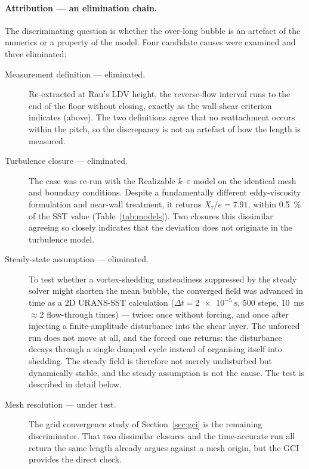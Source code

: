 \documentclass[11pt,a4paper]{article}
\newcommand{\Xr}{X_{\mathrm{r}}}
\begin{document}
\paragraph{Attribution --- an elimination chain.}
The discriminating question is whether the over-long bubble is an artefact
of the numerics or a property of the model. Four candidate causes were
examined and three eliminated:

\begin{description}
  \item[Measurement definition --- eliminated.] Re-extracted at Rau's LDV
  height, the reverse-flow interval runs to the end of the floor without
  closing, exactly as the wall-shear criterion indicates (above). The two
  definitions agree that no reattachment occurs within the pitch, so the
  discrepancy is not an artefact of how the length is measured.

  \item[Turbulence closure --- eliminated.] The case was re-run with the
  Realizable $k$--$\varepsilon$ model on the identical mesh and boundary
  conditions. Despite a fundamentally different eddy-viscosity formulation
  and near-wall treatment, it returns $\Xr/e = 7.91$, within
  \SI{0.5}{\percent} of the SST value (Table~\ref{tab:models}). Two closures
  this dissimilar agreeing so closely indicates that the deviation does not
  originate in the turbulence model.

  \item[Steady-state assumption --- eliminated.] To test whether a
  vortex-shedding unsteadiness suppressed by the steady solver might shorten
  the mean bubble, the converged field was advanced in time as a 2D
  URANS-SST calculation ($\Delta t = \SI{2e-5}{\second}$, 500 steps,
  \SI{10}{\milli\second} $\approx 2$ flow-through times) --- twice: once
  without forcing, and once after injecting a finite-amplitude disturbance
  into the shear layer. The unforced run does not move at all, and the
  forced one returns: the disturbance decays through a single damped cycle
  instead of organising itself into shedding. The steady field is therefore
  not merely undisturbed but dynamically stable, and the steady assumption
  is not the cause. The test is described in detail below.

  \item[Mesh resolution --- under test.] The grid convergence study of
  Section~\ref{sec:gci} is the remaining discriminator. That two dissimilar
  closures and the time-accurate run all return the same length already
  argues against a mesh origin, but the GCI provides the direct check.
\end{description}
\end{document}
